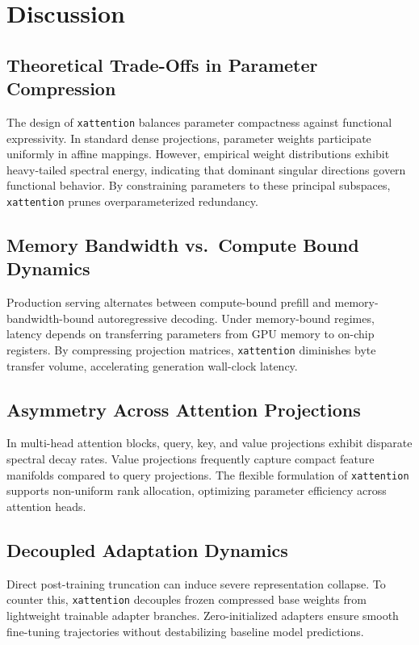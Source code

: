\section{Discussion}

\subsection{Theoretical Trade-Offs in Parameter Compression}
The design of \texttt{xattention} balances parameter compactness against functional expressivity. In standard dense projections, parameter weights participate uniformly in affine mappings. However, empirical weight distributions exhibit heavy-tailed spectral energy, indicating that dominant singular directions govern functional behavior. By constraining parameters to these principal subspaces, \texttt{xattention} prunes overparameterized redundancy.

\subsection{Memory Bandwidth vs.\ Compute Bound Dynamics}
Production serving alternates between compute-bound prefill and memory-bandwidth-bound autoregressive decoding. Under memory-bound regimes, latency depends on transferring parameters from GPU memory to on-chip registers. By compressing projection matrices, \texttt{xattention} diminishes byte transfer volume, accelerating generation wall-clock latency.

\subsection{Asymmetry Across Attention Projections}
In multi-head attention blocks, query, key, and value projections exhibit disparate spectral decay rates. Value projections frequently capture compact feature manifolds compared to query projections. The flexible formulation of \texttt{xattention} supports non-uniform rank allocation, optimizing parameter efficiency across attention heads.

\subsection{Decoupled Adaptation Dynamics}
Direct post-training truncation can induce severe representation collapse. To counter this, \texttt{xattention} decouples frozen compressed base weights from lightweight trainable adapter branches. Zero-initialized adapters ensure smooth fine-tuning trajectories without destabilizing baseline model predictions.

